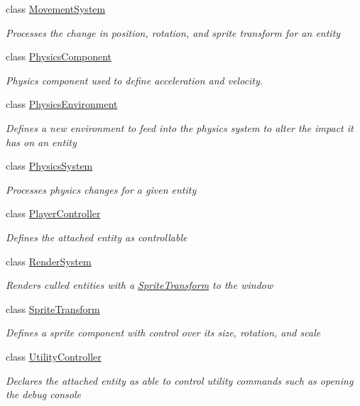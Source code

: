 \begin{DoxyCompactItemize}
class \hyperlink{class_m_b2_d_1_1_entity_component_1_1_movement_system}{Movement\+System}
\begin{DoxyCompactList}\small\item\em Processes the change in position, rotation, and sprite transform for an entity \end{DoxyCompactList}\item 
class \hyperlink{class_m_b2_d_1_1_entity_component_1_1_physics_component}{Physics\+Component}
\begin{DoxyCompactList}\small\item\em Physics component used to define acceleration and velocity. \end{DoxyCompactList}\item 
class \hyperlink{class_m_b2_d_1_1_entity_component_1_1_physics_environment}{Physics\+Environment}
\begin{DoxyCompactList}\small\item\em Defines a new environment to feed into the physics system to alter the impact it has on an entity \end{DoxyCompactList}\item 
class \hyperlink{class_m_b2_d_1_1_entity_component_1_1_physics_system}{Physics\+System}
\begin{DoxyCompactList}\small\item\em Processes physics changes for a given entity \end{DoxyCompactList}\item 
class \hyperlink{class_m_b2_d_1_1_entity_component_1_1_player_controller}{Player\+Controller}
\begin{DoxyCompactList}\small\item\em Defines the attached entity as controllable \end{DoxyCompactList}\item 
class \hyperlink{class_m_b2_d_1_1_entity_component_1_1_render_system}{Render\+System}
\begin{DoxyCompactList}\small\item\em Renders culled entities with a \hyperlink{class_m_b2_d_1_1_entity_component_1_1_sprite_transform}{Sprite\+Transform} to the window \end{DoxyCompactList}\item 
class \hyperlink{class_m_b2_d_1_1_entity_component_1_1_sprite_transform}{Sprite\+Transform}
\begin{DoxyCompactList}\small\item\em Defines a sprite component with control over its size, rotation, and scale \end{DoxyCompactList}\item 
class \hyperlink{class_m_b2_d_1_1_entity_component_1_1_utility_controller}{Utility\+Controller}
\begin{DoxyCompactList}\small\item\em Declares the attached entity as able to control utility commands such as opening the debug console \end{DoxyCompactList}\end{DoxyCompactItemize}
